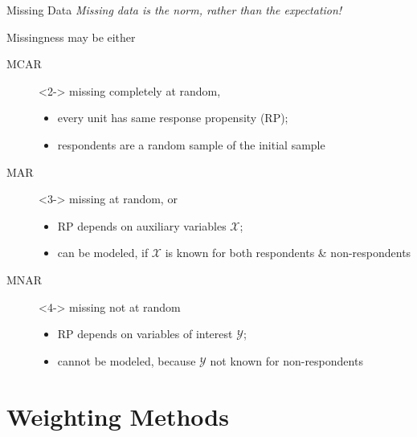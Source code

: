 \documentclass[10pt]{beamer}\usepackage[]{graphicx}\usepackage[]{color}
\begin{document}
\begin{frame}{Missing Data} 
\emph{Missing data is the norm, rather than the expectation!}

Missingness may be either
\begin{description} 
  \item[MCAR]<2-> missing completely at random,  
   \begin{itemize}
     \item every unit has same response propensity (RP);
     \item respondents are a random sample of the initial sample
   \end{itemize}
  \item[MAR]<3->  missing at random, or
   \begin{itemize}
     \item RP depends on auxiliary variables $\boldsymbol{\mathcal{X}}$;
     \item can be modeled, if $\boldsymbol{\mathcal{X}}$ is known for both respondents \& non-respondents
   \end{itemize}
  \item[MNAR]<4-> missing not at random \vspace{2mm}
  \begin{itemize}
    \item RP depends on variables of interest $\mathcal{Y}$; 
    \item cannot be modeled, because $\mathcal{Y}$ not known for non-respondents
  \end{itemize}
\end{description}
\end{frame}



\section{Weighting Methods}
\end{document}
